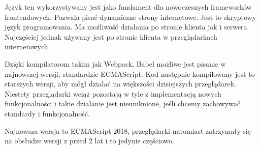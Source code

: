 Język ten wykorzystywany jest jako fundament dla nowoczesnych frameworków frontendowych. Pozwala pisać dynamiczne strony internetowe. Jest to skryptowy język programowania. Ma możliwość działania po stronie klienta jak i serwera. Najczęściej jednak używany jest po stronie klienta w przeglądarkach internetowych.  

Dzięki kompilatorom takim jak Webpack, Babel możliwe jest pisanie w najnowszej wersji, standardzie ECMAScript. Kod następnie kompilowany jest to starszych wersji, aby mógł działać na większości dzisiejszych przeglądarek. Niestety przeglądarki wciąż pozostają w tyle z implementacją nowych funkcjonalności i takie działanie jest nieuniknione, jeśli chcemy zachowywać standardy i funkcjonalność. 

Najnowsza wersja to ECMAScript 2018, przeglądarki natomiast zatrzymały się na obsłudze wersji z przed 2 lat i to jedynie częściowo. 